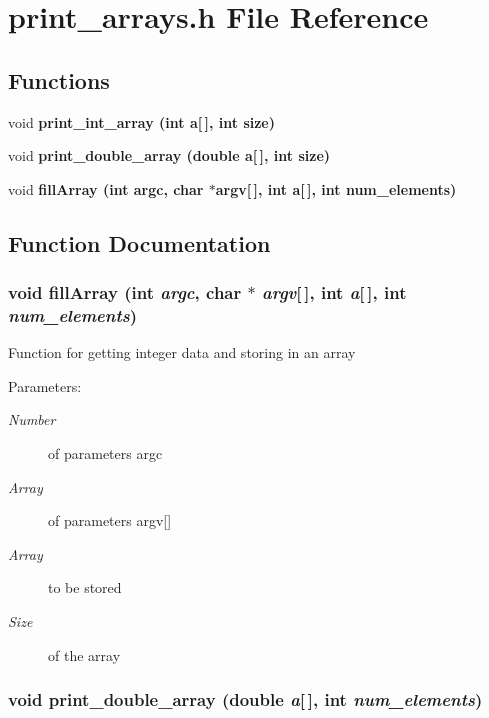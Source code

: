 \section{print\_\-arrays.h File Reference}
\label{print__arrays_8h}
\subsection*{Functions}
\begin{CompactItemize}
\item 
void \bf{print\_\-int\_\-array} (int a[$\,$], int size)
\item 
void \bf{print\_\-double\_\-array} (double a[$\,$], int size)
\item 
void \bf{fill\-Array} (int argc, char $\ast$argv[$\,$], int a[$\,$], int num\_\-elements)
\end{CompactItemize}


\subsection{Function Documentation}
\subsubsection{\setlength{\rightskip}{0pt plus 5cm}void fill\-Array (int {\em argc}, char $\ast$ {\em argv}[$\,$], int {\em a}[$\,$], int {\em num\_\-elements})}\label{print__arrays_8h_2a814cdfc58694c0558c1b809df1b766}


Function for getting integer data and storing in an array \begin{Desc}
\item[Parameters:]
\begin{description}
\item[{\em Number}]of parameters argc \item[{\em Array}]of parameters argv[] \item[{\em Array}]to be stored \item[{\em Size}]of the array \end{description}
\end{Desc}
\subsubsection{\setlength{\rightskip}{0pt plus 5cm}void print\_\-double\_\-array (double {\em a}[$\,$], int {\em num\_\-elements})}\label{print__arrays_8h_2c63d62a01ac25bf7c4fa67be16bf004}


